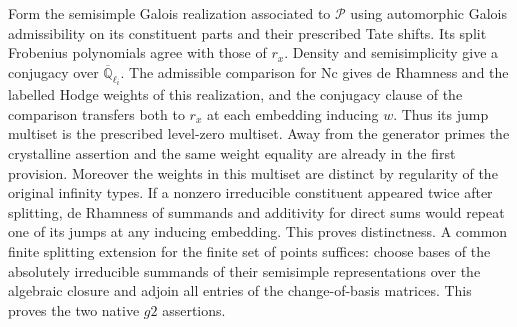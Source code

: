 Form the semisimple Galois realization associated to
$\mathcal P$ using automorphic Galois admissibility on its
constituent parts and their prescribed Tate shifts. Its split
Frobenius polynomials agree with those of $r_x$. Density and
semisimplicity give a conjugacy over $\overline{\mathbb Q}_{\ell_i}$.
The admissible comparison for $\mathrm{Nc}$ gives de Rhamness and
the labelled Hodge weights of this realization, and the
conjugacy clause of the comparison transfers both to $r_x$ at
each embedding inducing $w$. Thus its jump multiset is the
prescribed level-zero multiset. Away from the generator primes
the crystalline assertion and the same weight equality are
already in the first provision. Moreover the weights in this
multiset are distinct by regularity of the original infinity
types. If a nonzero irreducible constituent appeared twice
after splitting, de Rhamness of summands and additivity for
direct sums would repeat one of its jumps at any inducing
embedding. This proves distinctness. A common finite splitting
extension for the finite set of points suffices: choose bases of
the absolutely irreducible summands of their semisimple
representations over the algebraic closure and adjoin all
entries of the change-of-basis matrices. This proves the two
native $g2$ assertions.


